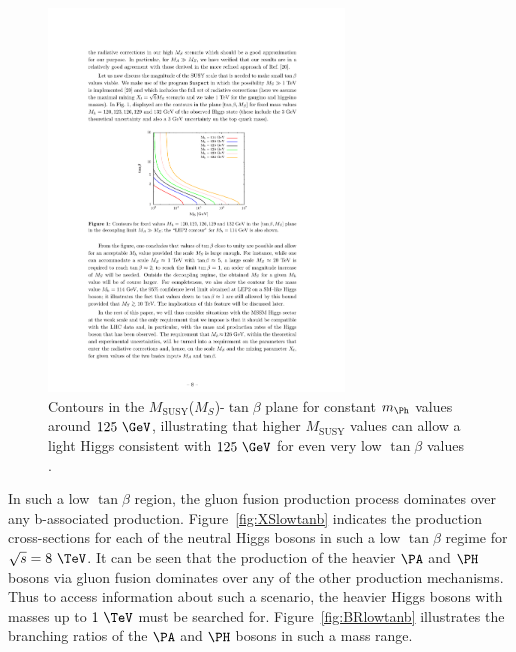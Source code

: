 \begin{figure}[htbp]
   \includegraphics[width=0.7\textwidth]{plots/theory/MSUSY_tanb.pdf}
\caption{Contours in the $M_{\text{SUSY}}$($M_{S}$)-$\tan\beta$ plane for
constant $m_{\Ph}$ values around $125~\GeV$, illustrating that higher
$M_{\text{SUSY}}$ values can allow a light Higgs consistent with $125~\GeV$ for
even very low $\tan\beta$ values \cite{Djouadi:2013vqa}.}
\label{fig:MSUSYcontours}
\end{figure}

In such a low $\tan\beta$ region, the gluon fusion production process dominates
over any b-associated production. Figure~\ref{fig:XSlowtanb} indicates the
production cross-sections for each of the neutral Higgs bosons in such a low
$\tan\beta$ regime for $\sqrt{s}=8~\TeV$. It can be seen that the production of
the heavier $\PA$ and $\PH$ bosons via gluon fusion dominates over any of the
other production mechanisms. Thus to access information about such a scenario,
the heavier Higgs bosons with masses up to $1~\TeV$ must be searched for.
Figure~\ref{fig:BRlowtanb} illustrates the branching ratios of the $\PA$ and
$\PH$ bosons in such a mass range. 

